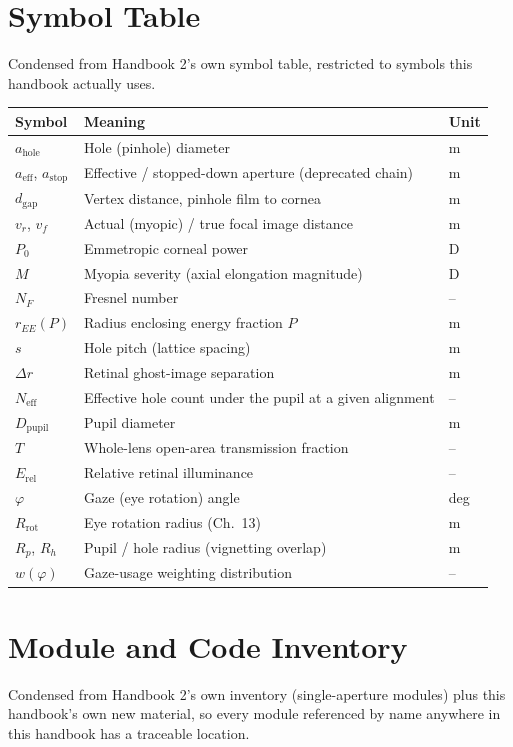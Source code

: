 \documentclass[11pt]{report}
\newcommand{\ahole}{a_{\text{hole}}}
\newcommand{\aeff}{a_{\text{eff}}}
\newcommand{\astop}{a_{\text{stop}}}
\newcommand{\dgap}{d_{\text{gap}}}
\newcommand{\vr}{v_r}
\newcommand{\vf}{v_f}
\newcommand{\Neff}{N_{\text{eff}}}
\newcommand{\Dpupil}{D_{\text{pupil}}}
\newcommand{\Erel}{E_{\text{rel}}}
\begin{document}
\chapter{Symbol Table}
Condensed from Handbook 2's own symbol table, restricted to symbols this handbook actually
uses.
\begin{longtable}{p{2.2cm}p{9.0cm}p{2.0cm}}
\toprule
\textbf{Symbol} & \textbf{Meaning} & \textbf{Unit} \\
\midrule
\endhead
$\ahole$ & Hole (pinhole) diameter & m \\
$\aeff$, $\astop$ & Effective / stopped-down aperture (deprecated chain) & m \\
$\dgap$ & Vertex distance, pinhole film to cornea & m \\
$\vr$, $\vf$ & Actual (myopic) / true focal image distance & m \\
$P_0$ & Emmetropic corneal power & D \\
$M$ & Myopia severity (axial elongation magnitude) & D \\
$N_F$ & Fresnel number & -- \\
$r_{EE}(P)$ & Radius enclosing energy fraction $P$ & m \\
$s$ & Hole pitch (lattice spacing) & m \\
$\Delta r$ & Retinal ghost-image separation & m \\
$\Neff$ & Effective hole count under the pupil at a given alignment & -- \\
$\Dpupil$ & Pupil diameter & m \\
$T$ & Whole-lens open-area transmission fraction & -- \\
$\Erel$ & Relative retinal illuminance & -- \\
$\varphi$ & Gaze (eye rotation) angle & deg \\
$R_{\text{rot}}$ & Eye rotation radius (Ch.~13) & m \\
$R_p$, $R_h$ & Pupil / hole radius (vignetting overlap) & m \\
$w(\varphi)$ & Gaze-usage weighting distribution & -- \\
\bottomrule
\end{longtable}

\chapter{Module and Code Inventory}
Condensed from Handbook 2's own inventory (single-aperture modules) plus this handbook's own
new material, so every module referenced by name anywhere in this handbook has a traceable
location.
\end{document}
